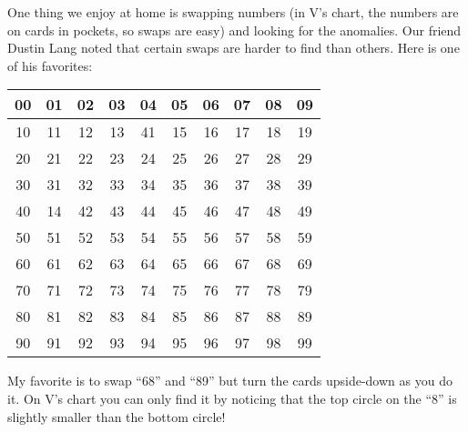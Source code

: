 \documentclass[12pt]{article}
\newcommand{\tablesize}{\footnotesize\sffamily}
\begin{document}
One thing we enjoy at home is swapping numbers (in V's chart, the
numbers are on cards in pockets, so swaps are easy) and looking for
the anomalies.  Our friend Dustin Lang noted that certain swaps are
harder to find than others.  Here is one of his favorites:
\begin{center}\tablesize
\begin{tabular}{|c|c|c|c|c|c|c|c|c|c|}
\hline
 00 & 01 & 02 & 03 & 04 & 05 & 06 & 07 & 08 & 09 \\ \hline
 10 & 11 & 12 & 13 & 41 & 15 & 16 & 17 & 18 & 19 \\ \hline
 20 & 21 & 22 & 23 & 24 & 25 & 26 & 27 & 28 & 29 \\ \hline
 30 & 31 & 32 & 33 & 34 & 35 & 36 & 37 & 38 & 39 \\ \hline
 40 & 14 & 42 & 43 & 44 & 45 & 46 & 47 & 48 & 49 \\ \hline
 50 & 51 & 52 & 53 & 54 & 55 & 56 & 57 & 58 & 59 \\ \hline
 60 & 61 & 62 & 63 & 64 & 65 & 66 & 67 & 68 & 69 \\ \hline
 70 & 71 & 72 & 73 & 74 & 75 & 76 & 77 & 78 & 79 \\ \hline
 80 & 81 & 82 & 83 & 84 & 85 & 86 & 87 & 88 & 89 \\ \hline
 90 & 91 & 92 & 93 & 94 & 95 & 96 & 97 & 98 & 99 \\ \hline
\end{tabular}
\end{center}
My favorite is to swap ``68'' and ``89'' but turn the cards
upside-down as you do it.  On V's chart you can only find it by
noticing that the top circle on the ``8'' is slightly smaller than the
bottom circle!
\end{document}
